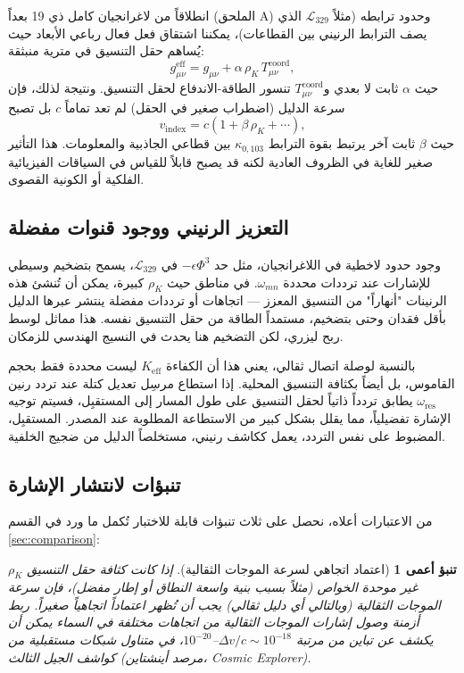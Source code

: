 \documentclass[11pt,a4paper]{article}
\newcommand{\Keff}{K_{\mathrm{eff}}}
\newtheorem{prediction}[theorem]{تنبؤ أعمى}
\begin{document}
	انطلاقاً من لاغرانجيان كامل ذي 19 بعداً (الملحق A) وحدود ترابطه (مثلاً \(\mathcal{L}_{329}\) الذي يصف الترابط الرنيني بين القطاعات)، يمكننا اشتقاق فعل فعال رباعي الأبعاد حيث يُساهم حقل التنسيق في مترية منبثقة:
	\begin{equation}
		g_{\mu\nu}^{\mathrm{eff}} = g_{\mu\nu} + \alpha \, \rho_K \, T_{\mu\nu}^{\mathrm{coord}},
	\end{equation}
	حيث \(\alpha\) ثابت لا بعدي و\(T_{\mu\nu}^{\mathrm{coord}}\) تنسور الطاقة-الاندفاع لحقل التنسيق. ونتيجة لذلك، فإن سرعة الدليل (اضطراب صغير في الحقل) لم تعد تماماً \(c\) بل تصبح
	\begin{equation}
		v_{\mathrm{index}} = c \left(1 + \beta \, \rho_K + \cdots \right),
	\end{equation}
	حيث \(\beta\) ثابت آخر يرتبط بقوة الترابط \(\kappa_{0,103}\) بين قطاعي الجاذبية والمعلومات. هذا التأثير صغير للغاية في الظروف العادية لكنه قد يصبح قابلاً للقياس في السياقات الفيزيائية الفلكية أو الكونية القصوى.
	
	\subsection{التعزيز الرنيني ووجود قنوات مفضلة}
	
	وجود حدود لاخطية في اللاغرانجيان، مثل حد \(-\epsilon \Phi^3\) في \(\mathcal{L}_{329}\)، يسمح بتضخيم وسيطي للإشارات عند ترددات محددة \(\omega_{mn}\). في مناطق حيث \(\rho_K\) كبيرة، يمكن أن تُنشئ هذه الرنينات "أنهاراً" من التنسيق المعزز — اتجاهات أو ترددات مفضلة ينتشر عبرها الدليل بأقل فقدان وحتى بتضخيم، مستمداً الطاقة من حقل التنسيق نفسه. هذا مماثل لوسط ربح ليزري، لكن التضخيم هنا يحدث في النسيج الهندسي للزمكان.
	
	بالنسبة لوصلة اتصال ثقالي، يعني هذا أن الكفاءة \(\Keff\) ليست محددة فقط بحجم القاموس، بل أيضاً بكثافة التنسيق المحلية. إذا استطاع مرسِل تعديل كتلة عند تردد رنين \(\omega_{\mathrm{res}}\) يطابق تردداً ذاتياً لحقل التنسيق على طول المسار إلى المستقبِل، فسيتم توجيه الإشارة تفضيلياً، مما يقلل بشكل كبير من الاستطاعة المطلوبة عند المصدر. المستقبِل، المضبوط على نفس التردد، يعمل ككاشف رنيني، مستخلصاً الدليل من ضجيج الخلفية.
	
	\subsection{تنبؤات لانتشار الإشارة}
	
	من الاعتبارات أعلاه، نحصل على ثلاث تنبؤات قابلة للاختبار تُكمل ما ورد في القسم \ref{sec:comparison}:
	
	\begin{prediction}[اعتماد اتجاهي لسرعة الموجات الثقالية]
		إذا كانت كثافة حقل التنسيق \(\rho_K\) غير موحدة الخواص (مثلاً بسبب بنية واسعة النطاق أو إطار مفضل)، فإن سرعة الموجات الثقالية (وبالتالي أي دليل ثقالي) يجب أن تُظهر اعتماداً اتجاهياً صغيراً. ربط أزمنة وصول إشارات الموجات الثقالية من اتجاهات مختلفة في السماء يمكن أن يكشف عن تباين من مرتبة \(\Delta v/c \sim 10^{-18}\)–\(10^{-20}\)، في متناول شبكات مستقبلية من كواشف الجيل الثالث (مرصد أينشتاين، Cosmic Explorer).
	\end{prediction}
	
\end{document}
